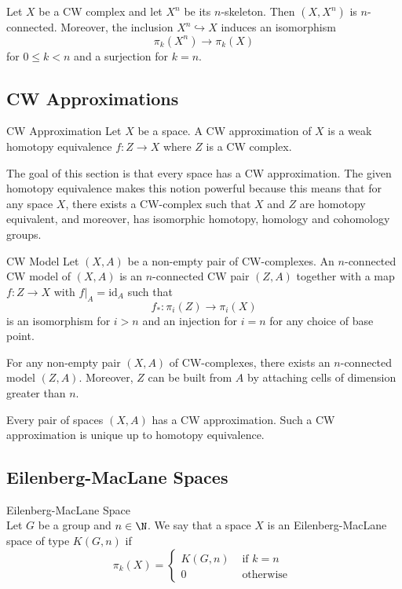 \documentclass[a4paper]{article}
\begin{document}
\begin{crl}{}{} Let $X$ be a CW complex and let $X^n$ be its $n$-skeleton. Then $(X,X^n)$ is $n$-connected. Moreover, the inclusion $X^n\hookrightarrow X$ induces an isomorphism $$\pi_k(X^n)\to\pi_k(X)$$ for $0\leq k<n$ and a surjection for $k=n$. 
\end{crl}

\subsection{CW Approximations}
\begin{defn}{CW Approximation}{} Let $X$ be a space. A CW approximation of $X$ is a weak homotopy equivalence $f:Z\to X$ where $Z$ is a CW complex. 
\end{defn}

The goal of this section is that every space has a CW approximation. The given homotopy equivalence makes this notion powerful because this means that for any space $X$, there exists a CW-complex such that $X$ and $Z$ are homotopy equivalent, and moreover, has isomorphic homotopy, homology and cohomology groups. 

\begin{defn}{CW Model}{} Let $(X,A)$ be a non-empty pair of CW-complexes. An $n$-connected CW model of $(X,A)$ is an $n$-connected CW pair $(Z,A)$ together with a map $f:Z\to X$ with $f|_A=\text{id}_A$ such that $$f_\ast:\pi_i(Z)\to\pi_i(X)$$ is an isomorphism for $i>n$ and an injection for $i=n$ for any choice of base point. 
\end{defn}

\begin{thm}{}{} For any non-empty pair $(X,A)$ of CW-complexes, there exists an $n$-connected model $(Z,A)$. Moreover, $Z$ can be built from $A$ by attaching cells of dimension greater than $n$. 
\end{thm}

\begin{thm}{}{} Every pair of spaces $(X,A)$ has a CW approximation. Such a CW approximation is unique up to homotopy equivalence. 
\end{thm}

\subsection{Eilenberg-MacLane Spaces}
\begin{defn}{Eilenberg-MacLane Space}{}\\
Let $G$ be a group and $n\in\N$. We say that a space $X$ is an Eilenberg-MacLane space of type $K(G,n)$ if $$\pi_k(X)=\begin{cases}
K(G,n) & \text{ if } k=n\\
0 & \text{ otherwise }
\end{cases}$$
\end{defn}
\end{document}
